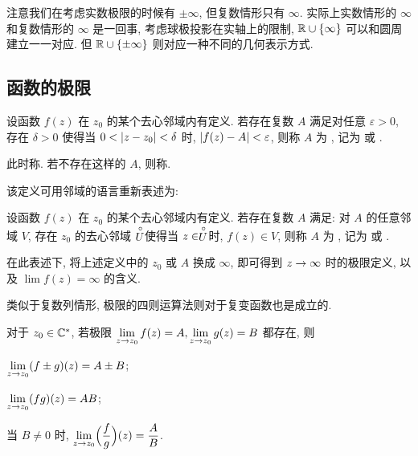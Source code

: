 注意我们在考虑实数极限的时候有 $\pm\infty$, 但复数情形只有 $\infty$.
实际上实数情形的 $\infty$ 和复数情形的 $\infty$ 是一回事, 考虑球极投影在实轴上的限制, ${\mathbb{R}}\cup\{\infty\}$ 可以和圆周建立一一对应.
但 ${\mathbb{R}}\cup\{\pm\infty\}$ 则对应一种不同的几何表示方式.


\subsection{函数的极限}

\begin{definition}
  设函数 $f(z)$ 在 $z_0$ 的某个去心邻域内有定义.
  若存在复数 $A$ 满足对任意 $\varepsilon>0$, 存在 $\delta>0$ 使得当 $0<\lvert z-z_0\rvert<\delta$ 时, $\lvert f(z)-A\rvert<\varepsilon$, 则称 $A$ 为 , 记为  或 .
\end{definition}

此时称.
若不存在这样的 $A$, 则称.

该定义可用邻域的语言重新表述为:
\begin{definition}
  设函数 $f(z)$ 在 $z_0$ 的某个去心邻域内有定义.
  若存在复数 $A$ 满足: 对 $A$ 的任意邻域 $V$, 存在 $z_0$ 的去心邻域 $\stackrel{\circ}{U}\!\!$ 使得当 $z\in\stackrel{\circ}{U}\!\!$ 时, $f(z)\in V$, 则称 $A$ 为 , 记为  或 .
\end{definition}

在此表述下, 将上述定义中的 $z_0$ 或 $A$ 换成 $\infty$, 即可得到 $z\rightarrow\infty$ 时的极限定义, 以及 $\lim f(z)=\infty$ 的含义.

类似于复数列情形, 极限的四则运算法则对于复变函数也是成立的.
\begin{theorem}
  \label{thm:limfunctionfour}
  对于 $z_0\in{\mathbb{C}}^*$, 若极限 $\lim\limits_{z\rightarrow z_0}f(z)=A,\lim\limits_{z\rightarrow z_0}g(z)=B$ 都存在, 则
  \begin{enuma}
    \item $\lim\limits_{z\rightarrow z_0}(f\pm g)(z)=A\pm B$;
    \item $\lim\limits_{z\rightarrow z_0}(fg)(z)=AB$;
    \item 当 $B\neq 0$ 时, $\lim\limits_{z\rightarrow z_0}\Bigl(\dfrac fg\Bigr)(z)=\dfrac AB$.
  \end{enuma}
\end{theorem}

